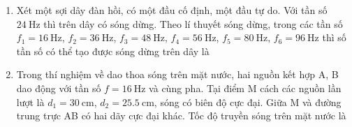\begin{enumerate}[label=\bfseries Câu \arabic*:]
\item Xét một sợi dây đàn hồi, có một đầu cố định, một đầu tự do. Với tần số $\SI{24}{\hertz}$ thì trên dây có sóng dừng. Theo lí thuyết sóng dừng, trong các tần số $f_1=\SI{16}{\hertz}$, $f_2=\SI{36}{\hertz}$, $f_3=\SI{48}{\hertz}$, $f_4=\SI{56}{\hertz}$, $f_5=\SI{80}{\hertz}$, $f_6=\SI{96}{\hertz}$ thì số tần số có thể tạo được sóng dừng trên dây là

\item Trong thí nghiệm về dao thoa sóng trên mặt nước, hai nguồn kết hợp A, B dao động với tần số $f=\SI{16}{\hertz}$ và cùng pha. Tại điểm M cách các nguồn lần lượt là $d_1=\SI{30}{\centi\meter}$, $d_2=\SI{25.5}{\centi\meter}$, sóng có biên độ cực đại. Giữa M và đường trung trực AB có hai dãy cực đại khác. Tốc độ truyền sóng trên mặt nước là


\end{enumerate}
